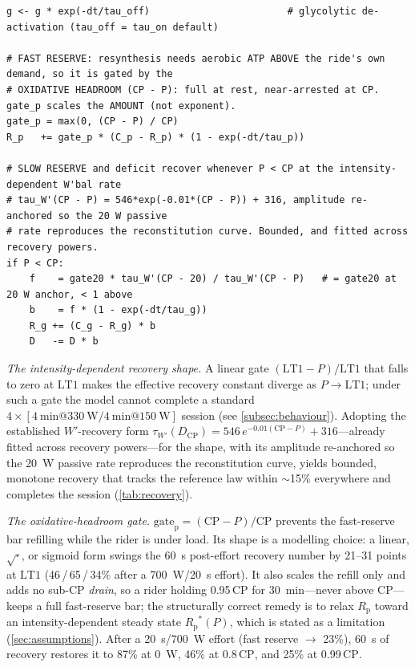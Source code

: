 \documentclass[11pt,a4paper]{article}
\newcommand{\Wp}{\ensuremath{W'}}
\newcommand{\CP}{\ensuremath{\mathrm{CP}}}
\newcommand{\LTone}{\ensuremath{\mathrm{LT1}}}
\newcommand{\Rp}{\ensuremath{R_{\mathrm p}}}
\newcommand{\tauW}{\ensuremath{\tau_{W'}}}
\newcommand{\gatep}{\ensuremath{\mathrm{gate}_{\mathrm p}}}
\begin{document}
\begin{lstlisting}[style=pseudo]
g <- g * exp(-dt/tau_off)                        # glycolytic de-activation (tau_off = tau_on default)

# FAST RESERVE: resynthesis needs aerobic ATP ABOVE the ride's own demand, so it is gated by the
# OXIDATIVE HEADROOM (CP - P): full at rest, near-arrested at CP. gate_p scales the AMOUNT (not exponent).
gate_p = max(0, (CP - P) / CP)
R_p   += gate_p * (C_p - R_p) * (1 - exp(-dt/tau_p))

# SLOW RESERVE and deficit recover whenever P < CP at the intensity-dependent W'bal rate
# tau_W'(CP - P) = 546*exp(-0.01*(CP - P)) + 316, amplitude re-anchored so the 20 W passive
# rate reproduces the reconstitution curve. Bounded, and fitted across recovery powers.
if P < CP:
    f    = gate20 * tau_W'(CP - 20) / tau_W'(CP - P)   # = gate20 at 20 W anchor, < 1 above
    b    = f * (1 - exp(-dt/tau_g))
    R_g += (C_g - R_g) * b
    D   -= D * b
\end{lstlisting}

\emph{The intensity-dependent recovery shape.} A linear gate $(\LTone - P)/\LTone$ that falls to zero at
\LTone{} makes the effective recovery constant diverge as $P \to \LTone$; under such a gate the model
cannot complete a standard $4\times[\SI{4}{\minute}@\SI{330}{\watt} / \SI{4}{\minute}@\SI{150}{\watt}]$
session (see \cref{subsec:behaviour}). Adopting the established \Wp-recovery form
$\tauW(D_{\CP}) = 546\,e^{-0.01(\CP-P)}+316$\citep{Skiba2012}---already fitted across recovery
powers---for the shape, with its amplitude re-anchored so the 20~W passive rate reproduces the
reconstitution curve, yields bounded, monotone recovery that tracks the reference law within $\sim$15\%
everywhere and completes the session (\cref{tab:recovery}).

\emph{The oxidative-headroom gate.} $\gatep = (\CP-P)/\CP$ prevents the fast-reserve bar refilling while
the rider is under load. Its shape is a modelling choice: a linear, $\sqrt{\cdot}$, or sigmoid form swings
the 60~s post-effort recovery number by 21--31 points at \LTone{} (46\,/\,65\,/\,34\% after a
700~W/20~s effort). It also scales the refill only and adds no sub-\CP{} \emph{drain}, so a rider holding
0.95\,\CP{} for 30~min---never above \CP---keeps a full fast-reserve bar; the structurally correct
remedy is to relax \Rp{} toward an intensity-dependent steady state $\Rp^{*}(P)$, which is stated as a
limitation (\cref{sec:assumptions}). After a 20~s/700~W effort (fast reserve $\to$ 23\%), 60~s of recovery
restores it to 87\% at 0~W, 46\% at 0.8\,\CP, and 25\% at 0.99\,\CP.
\end{document}
